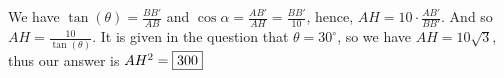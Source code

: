 \begin{solution}
We have \(\tan(\theta)=\frac{BB'}{AB}\) and \(\cos\alpha=\frac{AB'}{AH}=\frac{BB'}{10}\), hence, \(AH=10\cdot\frac{AB'}{BB'}\). And so \(AH=\frac{10}{\tan(\theta)}\). It is given in the question that \(\theta=30^{\circ}\), so we have \(AH=10\sqrt{3}\), thus our answer is \(AH^2=\fbox{300}\)
\end{solution}\bigskip
